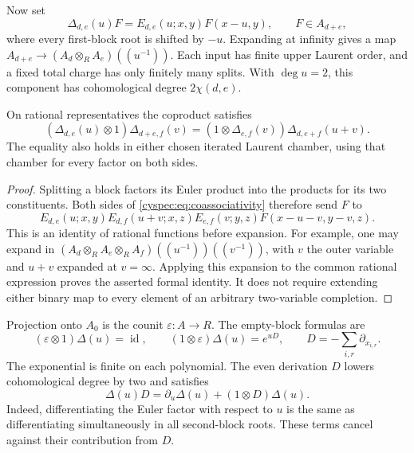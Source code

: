 Now set
\begin{equation}\label{cyspec:eq:coproduct}
 \Delta_{d,e}(u)F=E_{d,e}(u;x,y)F(x-u,y),
 \qquad F\in A_{d+e},
\end{equation}
where every first-block root is shifted by $-u$.
Expanding at infinity gives a map
$A_{d+e}\to(A_d\otimes_R A_e)((u^{-1}))$.
Each input has finite upper Laurent order, and a fixed total charge
has only finitely many splits. With $\deg u=2$, this component has
cohomological degree $2\chi(d,e)$.

\begin{theorem}\label{cyspec:thm:coassociativity}
On rational representatives the coproduct satisfies
\begin{equation}\label{cyspec:eq:coassociativity}
 (\Delta_{d,e}(u)\otimes1)\Delta_{d+e,f}(v)
 =(1\otimes\Delta_{e,f}(v))\Delta_{d,e+f}(u+v).
\end{equation}
The equality also holds in either chosen iterated Laurent chamber,
using that chamber for every factor on both sides.
\end{theorem}

\begin{proof}
Splitting a block factors its Euler product into the products for
its two constituents. Both sides of \eqref{cyspec:eq:coassociativity}
therefore send $F$ to
\[
 E_{d,e}(u;x,y)E_{d,f}(u+v;x,z)E_{e,f}(v;y,z)
 F(x-u-v,y-v,z).
\]
This is an identity of rational functions before expansion.
For example, one may expand in
$(A_d\otimes_R A_e\otimes_R A_f)((u^{-1}))((v^{-1}))$,
with $v$ the outer variable and $u+v$ expanded at $v=\infty$.
Applying this expansion to the common rational expression proves
the asserted formal identity. It does not require extending either
binary map to every element of an arbitrary two-variable completion.
\end{proof}

Projection onto $A_0$ is the counit $\varepsilon:A\to R$.
The empty-block formulas are
\begin{equation}\label{cyspec:eq:counits}
 (\varepsilon\otimes1)\Delta(u)=\operatorname{id},\qquad
 (1\otimes\varepsilon)\Delta(u)=e^{uD},\qquad
 D=-\sum_{i,r}\partial_{x_{i,r}}.
\end{equation}
The exponential is finite on each polynomial. The even derivation
$D$ lowers cohomological degree by two and satisfies
\[
 \Delta(u)D=\partial_u\Delta(u)+(1\otimes D)\Delta(u).
\]
Indeed, differentiating the Euler factor with respect to $u$ is
the same as differentiating simultaneously in all second-block
roots. These terms cancel against their contribution from $D$.

